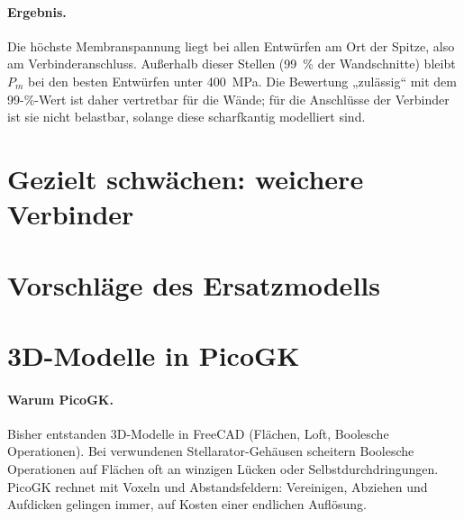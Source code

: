 \documentclass[10pt,a4paper]{article}
\begin{document}
\paragraph{Ergebnis.} Die höchste Membranspannung liegt bei allen Entwürfen am Ort der Spitze, also am
Verbinderanschluss. Außerhalb dieser Stellen (99~\% der Wandschnitte) bleibt $P_m$ bei den besten Entwürfen unter
\SI{400}{MPa}. Die Bewertung „zulässig“ mit dem 99-\%-Wert ist daher vertretbar für die Wände; für die Anschlüsse der
Verbinder ist sie nicht belastbar, solange diese scharfkantig modelliert sind.

\section{Gezielt schwächen: weichere Verbinder}\label{sec:schwaechen}


\section{Vorschläge des Ersatzmodells}\label{sec:ersatz1}


\section{3D-Modelle in PicoGK}\label{sec:3d}
\paragraph{Warum PicoGK.} Bisher entstanden 3D-Modelle in FreeCAD (Flächen, Loft, Boolesche Operationen). Bei
verwundenen Stellarator-Gehäusen scheitern Boolesche Operationen auf Flächen oft an winzigen Lücken oder
Selbstdurchdringungen. PicoGK \cite{picogk} rechnet mit Voxeln und Abstandsfeldern: Vereinigen, Abziehen und
Aufdicken gelingen immer, auf Kosten einer endlichen Auflösung.
\end{document}
